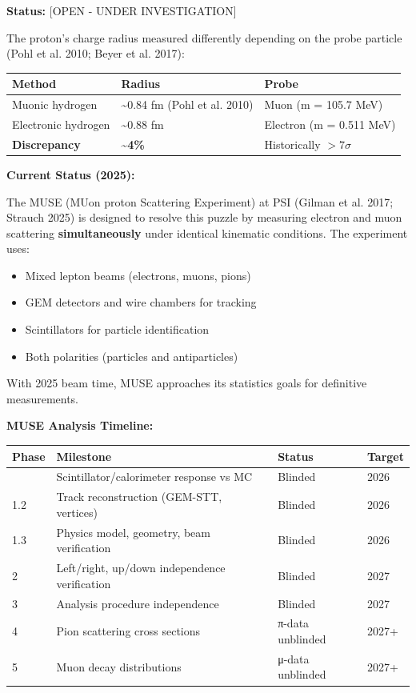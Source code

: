 \documentclass[
  11pt,
  letterpaper,
  twoside,
  openany]{book}
\providecommand{\tightlist}{%
  \setlength{\itemsep}{0pt}\setlength{\parskip}{0pt}}
\begin{document}
\textbf{Status:} {[}OPEN - UNDER INVESTIGATION{]}

The proton's charge radius measured differently depending on the probe
particle (Pohl et al. 2010; Beyer et al. 2017):

\begin{longtable}[]{@{}lll@{}}
\toprule\noalign{}
Method & Radius & Probe \\
\midrule\noalign{}
\endhead
\bottomrule\noalign{}
\endlastfoot
Muonic hydrogen & \textasciitilde0.84 fm (Pohl et al. 2010) & Muon (m =
105.7 MeV) \\
Electronic hydrogen & \textasciitilde0.88 fm & Electron (m = 0.511
MeV) \\
\textbf{Discrepancy} & \textbf{\textasciitilde4\%} & Historically
\(> 7\sigma\) \\
\end{longtable}

\textbf{Current Status (2025):}

The MUSE (MUon proton Scattering Experiment) at PSI (Gilman et al. 2017;
Strauch 2025) is designed to resolve this puzzle by measuring electron
and muon scattering \textbf{simultaneously} under identical kinematic
conditions. The experiment uses:

\begin{itemize}
\tightlist
\item
  Mixed lepton beams (electrons, muons, pions)
\item
  GEM detectors and wire chambers for tracking
\item
  Scintillators for particle identification
\item
  Both polarities (particles and antiparticles)
\end{itemize}

With 2025 beam time, MUSE approaches its statistics goals for definitive
measurements.

\textbf{MUSE Analysis Timeline:}

\begin{longtable}[]{@{}llll@{}}
\toprule\noalign{}
Phase & Milestone & Status & Target \\
\midrule\noalign{}
\endhead
\bottomrule\noalign{}
\endlastfoot
1.1 & Scintillator/calorimeter response vs MC & Blinded & 2026 \\
1.2 & Track reconstruction (GEM-STT, vertices) & Blinded & 2026 \\
1.3 & Physics model, geometry, beam verification & Blinded & 2026 \\
2 & Left/right, up/down independence verification & Blinded & 2027 \\
3 & Analysis procedure independence & Blinded & 2027 \\
4 & Pion scattering cross sections & π-data unblinded & 2027+ \\
5 & Muon decay distributions & μ-data unblinded & 2027+ \\
\end{longtable}
\end{document}
